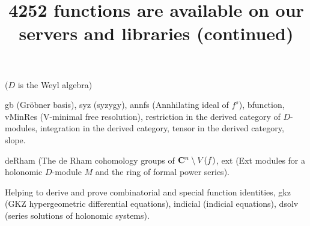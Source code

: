 \documentclass[twocolumn]{article}
\title{\huge \color{blue} 4252 functions are available
on our servers and libraries (continued)}
\author{} \date{}
\begin{document}
\maketitle

\noindent
{} ($D$ is the Weyl algebra)

\noindent
{\color{red} gb } (Gr\"obner basis),
{\color{red} syz} (syzygy),
{\color{red} annfs} (Annhilating ideal of $f^s$),
{\color{red} bfunction},
{\color{red} vMinRes} (V-minimal free resolution),
{\color{red} restriction} in the derived category of $D$-modules,
{\color{red} integration} in the derived category,
{\color{red} tensor}  in the derived category,
{\color{red} slope}.

\medbreak
\noindent
{} 

\noindent
{\color{red} deRham} (The de Rham cohomology groups of
${\bf C}^n \setminus V(f)$,
{\color{red} ext} (Ext modules for a holonomic $D$-module $M$
and the ring of formal power series).

\medbreak
\noindent
{}

\noindent
Helping to derive and prove {\color{red} combinatorial} and
{\color{red} special function identities},
{\color{red} gkz} (GKZ hypergeometric differential equations),
{\color{red} indicial} (indicial equations),
{\color{red} dsolv} (series solutions of holonomic systems).
\end{document}
